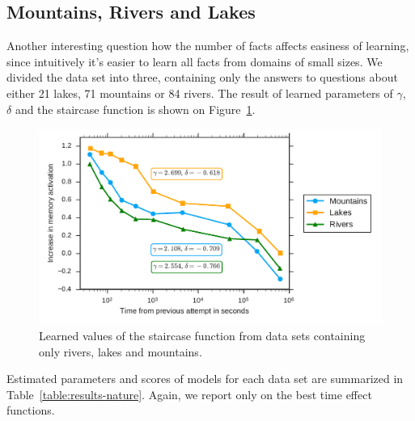 \subsection{Mountains, Rivers and Lakes}

Another interesting question how the number of facts affects easiness of learning, since intuitively it's easier to learn all facts from domains of small sizes. We divided the data set into three, containing only the answers to questions about either 21 lakes, 71 mountains or 84 rivers. The result of learned parameters of $\gamma$, $\delta$ and the staircase function is shown on Figure~\ref{fig:lakes-rivers-mountains}.

\begin{figure}[htbp]
  \centering
  \includegraphics[width=\textwidth]{img/lakes-rivers-mountains}
  \caption{Learned values of the staircase function from data sets containing only rivers, lakes and mountains.}
  \label{fig:lakes-rivers-mountains}
\end{figure}

Estimated parameters and scores of models for each data set are summarized in Table~\ref{table:results-nature}. Again, we report only on the best time effect functions.


